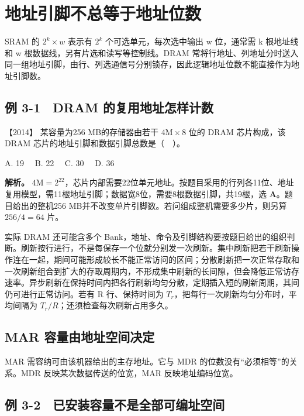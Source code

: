 \section{地址引脚不总等于地址位数}\label{co-03-03}

SRAM 的 \(2^k\times w\) 表示有 \(2^k\) 个可选单元，每次选中输出 w 位，通常需 k 根地址线和 w 根数据线，另有片选和读写等控制线。DRAM 常将行地址、列地址分时送入同一组地址引脚，由行、列选通信号分别锁存，因此逻辑地址位数不能直接作为地址引脚数。

\subsection{例 3-1　DRAM 的复用地址怎样计数}\label{co-ex3-1}

\noindent{}【2014】 某容量为256 MB的存储器由若干 \(4\mathrm M\times8\) 位的 DRAM 芯片构成，该 DRAM 芯片的地址引脚和数据引脚总数是（　）。

A. 19　 B. 22　 C. 30　 D. 36


\textbf{解析。} \(4\mathrm M=2^{22}\)，芯片内部需要22位单元地址。按题目采用的行列各11位、地址复用模型，需11根地址引脚；数据宽8位，需要8根数据引脚，共19根，选 \textbf{A}。题目给出的整机256 MB并不改变单片引脚数。若问组成整机需要多少片，则另算 \(256/4=64\) 片。

实际 DRAM 还可能含多个 Bank，地址、命令及引脚结构要按题目给出的组织判断。刷新按行进行，不是每保存一个位就分别发一次刷新。集中刷新把若干刷新操作连在一起，期间可能形成较长不能正常访问的区间；分散刷新把一次正常存取和一次刷新组合到扩大的存取周期内，不形成集中刷新的长间隙，但会降低正常访存速率。异步刷新在保持时间内把各行刷新均匀分散，定期插入短的刷新周期，其间仍可进行正常访问。若有 R 行、保持时间为 \(T_r\)，把每行一次刷新均匀分布时，平均间隔为 \(T_r/R\)；还须检查每次刷新占用多久。

\subsection{MAR 容量由地址空间决定}\label{co-c03-h35}

MAR 需容纳可由该机器给出的主存地址。它与 MDR 的位数没有``必须相等''的关系。MDR 反映某次数据传送的位宽，MAR 反映地址编码位宽。

\subsection{例 3-2　已安装容量不是全部可编址空间}\label{co-ex3-2}

